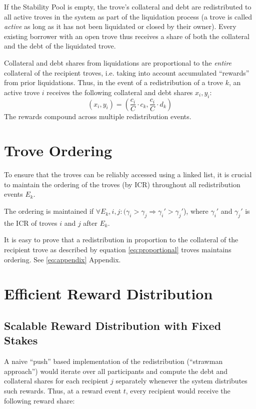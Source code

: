 \documentclass[reqno]{article}
\begin{document}
If the Stability Pool is empty, the trove's collateral and debt are redistributed to all active troves in the system as part of the liquidation process (a trove is called \textit{active} as long as it has not been liquidated or closed by their owner). Every existing borrower with an open trove thus receives a share of both the collateral and the debt of the liquidated trove.

Collateral and debt shares from liquidations are proportional to the \textit{entire} collateral of the recipient troves, i.e. taking into account accumulated “rewards” from prior liquidations. Thus, in the event of a redistribution of a trove $k$, an active trove $i$ receives the following collateral and debt shares $x_i,y_i$:  
\begin{equation} \label{eq:proportional}
  (x_i, y_i) = \left(\frac{c_i}{C} \cdot c_k, \frac{c_i}{C} \cdot d_k\right)
\end{equation}
The rewards compound across multiple redistribution events.

\section{Trove Ordering}
To ensure that the troves can be reliably accessed using a linked list, it is crucial to maintain the ordering of the troves (by ICR) throughout all redistribution events $E_k$.

The ordering is maintained if $\forall{E_k,i,j}: (\gamma_i > \gamma_j	\Longrightarrow \gamma_i' > \gamma_j'$), where $\gamma_i'$ and $\gamma_j'$ is the ICR of troves $i$ and $j$ after $E_k$.

It is easy to prove that a redistribution in proportion to the collateral of the recipient trove as described by equation \ref{eq:proportional} troves maintains ordering. See \ref{eq:appendix} Appendix.

\section{Efficient Reward Distribution}

\subsection{Scalable Reward Distribution with Fixed Stakes}

A naive “push” based implementation of the redistribution (“strawman approach”) would iterate over all participants and compute the debt and collateral shares  for each recipient $j$ separately whenever the system distributes such rewards. Thus, at a reward event $t$, every recipient would receive the following reward share:
\end{document}
